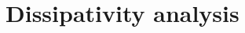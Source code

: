 \begin{comment}
	\begin{theorem}[A semi-definite programming approach \cite{8960476}]
		\label{ch4:t:LQgaindata}
	Let $Q \geq 0$ and $R > 0$. Suppose that the data $(U_-,X)$ are informative for optimal linear quadratic regulation. Consider the linear operator $P\mapsto\calL(P)$ defined by
	$$
	\mathcal{L}(P) := \xmt P\xm-\xpt P\xp -\xmt Q\xm-\umt R\um.
	$$
	Let $P^+$ be as in Lemma~\ref{ch4:l: same P works for all}. The following statements hold:
		\begin{enumerate}
			\item \label{ch4:semidefiniteprogram} The matrix $P^+$ is equal to the unique solution to the optimization problem
			\begin{align*}
			\text{ maximize } \: &\trace(P) \\
			\text{ subject to } \: &P  \geq 0 
			\,\,\text{ and }\,\,  \mathcal{L}(P) \leq 0.
			\end{align*} 
			\item There exists a right inverse $X_-^\sharp$ of $X_-$ such that
				\begin{align}
				\label{ch4:eq:1}
				\mathcal{L}(P^+) X_-^\sharp &= 0.
				\end{align}
			Moreover, if $X_-^\sharp$ satisfies \eqref{ch4:eq:1}, then the optimal feedback gain is given by $K = U_- X_-^\sharp$.
		\end{enumerate}
	\end{theorem}
	From a design viewpoint, the optimal feedback gain $K$ can be found in the following way. First solve the semidefinite program in Theorem \ref{ch4:t:LQgaindata}. Subsequently, compute a solution $X_-^\sharp$ to the linear equations $X_- X_-^\sharp = I$ and \eqref{ch4:eq:1}. Then, the optimal feedback gain is given by $K = U_- X_-^\sharp$.

\end{comment}
\section{Dissipativity analysis}
